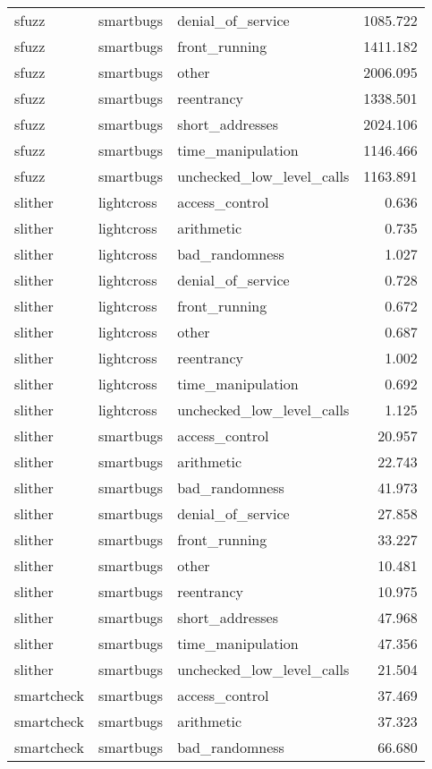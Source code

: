 \begin{tabular}[t]{lllr}
sfuzz & smartbugs & denial\_of\_service & 1085.722\\
sfuzz & smartbugs & front\_running & 1411.182\\
\addlinespace
sfuzz & smartbugs & other & 2006.095\\
sfuzz & smartbugs & reentrancy & 1338.501\\
sfuzz & smartbugs & short\_addresses & 2024.106\\
sfuzz & smartbugs & time\_manipulation & 1146.466\\
sfuzz & smartbugs & unchecked\_low\_level\_calls & 1163.891\\
\addlinespace
slither & lightcross & access\_control & 0.636\\
slither & lightcross & arithmetic & 0.735\\
slither & lightcross & bad\_randomness & 1.027\\
slither & lightcross & denial\_of\_service & 0.728\\
slither & lightcross & front\_running & 0.672\\
\addlinespace
slither & lightcross & other & 0.687\\
slither & lightcross & reentrancy & 1.002\\
slither & lightcross & time\_manipulation & 0.692\\
slither & lightcross & unchecked\_low\_level\_calls & 1.125\\
slither & smartbugs & access\_control & 20.957\\
\addlinespace
slither & smartbugs & arithmetic & 22.743\\
slither & smartbugs & bad\_randomness & 41.973\\
slither & smartbugs & denial\_of\_service & 27.858\\
slither & smartbugs & front\_running & 33.227\\
slither & smartbugs & other & 10.481\\
\addlinespace
slither & smartbugs & reentrancy & 10.975\\
slither & smartbugs & short\_addresses & 47.968\\
slither & smartbugs & time\_manipulation & 47.356\\
slither & smartbugs & unchecked\_low\_level\_calls & 21.504\\
smartcheck & smartbugs & access\_control & 37.469\\
\addlinespace
smartcheck & smartbugs & arithmetic & 37.323\\
smartcheck & smartbugs & bad\_randomness & 66.680\\

\end{tabular}
